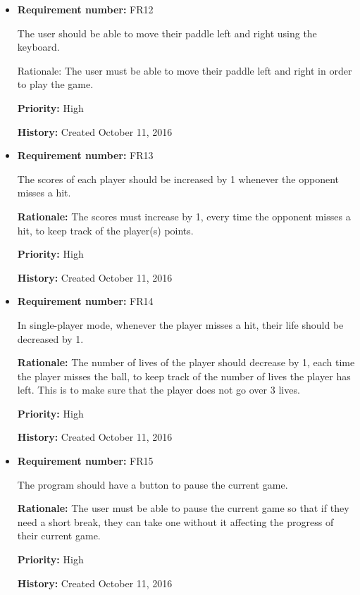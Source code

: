 \documentclass[12pt,letterpaper]{article}
\begin{document}
\begin{reqbox}
	\begin{itemize}
		\item \textbf{Requirement number: }FR12

		The user should be able to move their paddle left and right using the keyboard.

		Rationale: The user must be able to move their paddle left and right in order to play the game.

		\textbf{Priority: }High

		\textbf{History: }Created October 11, 2016
	\end{itemize}
\end{reqbox}

\begin{reqbox}
	\begin{itemize}
		\item \textbf{Requirement number: }FR13

		The scores of each player should be increased by 1 whenever the opponent misses a hit.

		\textbf{Rationale: }The scores must increase by 1, every time the opponent misses a hit, to keep track of the player(s) points.

		\textbf{Priority: }High

		\textbf{History: }Created October 11, 2016
	\end{itemize}
\end{reqbox}

\begin{reqbox}
	\begin{itemize}

		\item \textbf{Requirement number: }FR14

		In single-player mode, whenever the player misses a hit, their life should be decreased by 1.

		\textbf{Rationale: }The number of lives of the player should decrease by 1, each time the player misses the ball, to keep track of the number of lives the player has left. This is to make sure that the player does not go over 3 lives.

		\textbf{Priority: }High

		\textbf{History: }Created October 11, 2016
	\end{itemize}
\end{reqbox}

\begin{reqbox}
	\begin{itemize}

		\item \textbf{Requirement number: }FR15

		The program should have a button to pause the current game.

		\textbf{Rationale: }The user must be able to pause the current game so that if they need a short break, they can take one without it affecting the progress of their current game.

		\textbf{Priority: }High

		\textbf{History: }Created October 11, 2016
	\end{itemize}
\end{reqbox}
\end{document}
